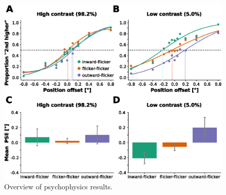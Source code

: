 \begin{figure}[htb!]
\captionsetup{labelformat=simple}
\centering
\includegraphics[width=\textwidth]{figures/chapter_04/fig3.eps}
\caption{Overview of psychophysics results.}
\end{figure}

